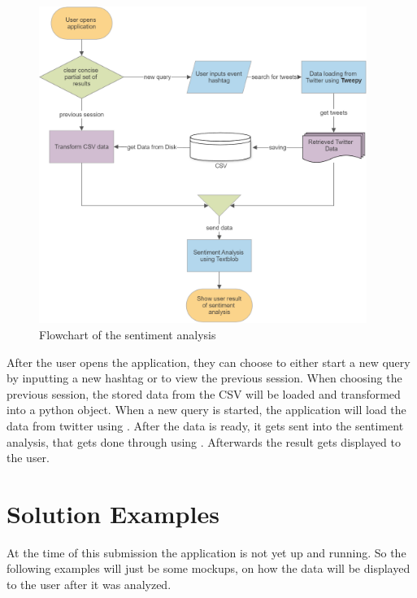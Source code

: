 \documentclass[a4paper,oneside,11pt]{scrreprt}
\begin{document}
\begin{figure}[h]
    \centering
    \caption{Flowchart of the sentiment analysis}
    \includegraphics[width=0.95\textwidth]{media/sentiment_analysis_flowchart.png}
\end{figure}

After the user opens the application, they can choose to either start a new query by inputting a new hashtag or to view the previous session. When choosing the previous session, the stored data from the CSV will be loaded and transformed into a python object. When a new query is started, the application will load the data from twitter using . After the data is ready, it gets sent into the sentiment analysis, that gets done through using . Afterwards the result gets displayed to the user.


\chapter{Solution Examples}
At the time of this submission the application is not yet up and running. So the following examples will just be some mockups, on how the data will be displayed to the user after it was analyzed. 
\end{document}
